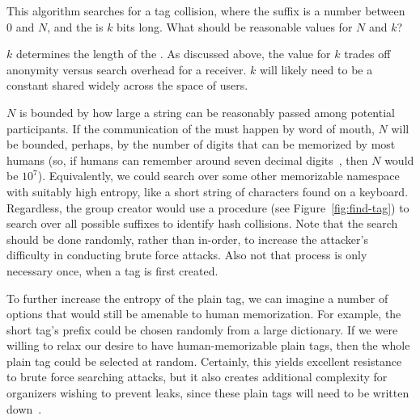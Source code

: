 %
This algorithm searches for a tag collision, where the  suffix is
a number between 0 and $N$, and the  is $k$ bits long.
What should be reasonable values for $N$ and $k$?

$k$ determines the length of the . As discussed above, the value for $k$
trades off anonymity versus search overhead for a receiver. $k$ will likely need to be
a constant shared widely across the space of \hoot users.

$N$ is bounded by how large a  string can be reasonably
passed among potential \hoot participants. If the communication of the
 must happen by word of mouth, $N$ will be bounded,
perhaps, by the number of digits that can be memorized by most humans
(so, if humans can remember around seven decimal
digits~\cite{miller56}, then $N$ would be $10^7$). Equivalently, we
could search over some other memorizable namespace with suitably high
entropy, like a short string of characters found on a keyboard.
Regardless, the group creator would use a  procedure (see
Figure~\ref{fig:find-tag}) to search over all possible suffixes to
identify hash collisions. Note that the search should be done
randomly, rather than in-order, to increase the attacker's difficulty
in conducting brute force attacks. Also not that process is only
necessary once, when a tag is first created. 

To further increase the entropy of the plain tag, we can imagine a
number of
options that would still be amenable to human memorization. For
example, the short tag's prefix could be
chosen randomly from a large dictionary.
If we were willing to relax our desire to have human-memorizable
plain tags, then the whole plain tag could be selected at random.
Certainly, this yields excellent resistance to brute force searching
attacks,
but it also creates additional complexity
for organizers wishing to prevent leaks, since these plain tags will need
to be written down~\cite{written-passwords}.

